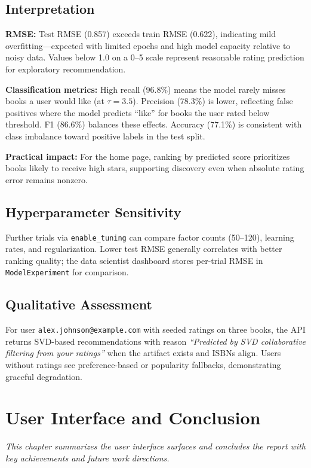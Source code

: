 \documentclass[12pt,a4paper]{report}
\newcommand{\chapterdesc}[1]{%
    \vspace{-0.6\baselineskip}
    \noindent\hspace*{1.5cm}\parbox{\dimexpr\textwidth-1.5cm\relax}{\textit{#1}}
    \par\vspace{0.3\baselineskip}
}
\begin{document}
\section{Interpretation}

\textbf{RMSE:} Test RMSE (0.857) exceeds train RMSE (0.622), indicating mild overfitting---expected with limited epochs and high model capacity relative to noisy data. Values below 1.0 on a 0--5 scale represent reasonable rating prediction for exploratory recommendation.

\textbf{Classification metrics:} High recall (96.8\%) means the model rarely misses books a user would like (at $\tau=3.5$). Precision (78.3\%) is lower, reflecting false positives where the model predicts ``like'' for books the user rated below threshold. F1 (86.6\%) balances these effects. Accuracy (77.1\%) is consistent with class imbalance toward positive labels in the test split.

\textbf{Practical impact:} For the home page, ranking by predicted score prioritizes books likely to receive high stars, supporting discovery even when absolute rating error remains nonzero.

\section{Hyperparameter Sensitivity}

Further trials via \texttt{enable\_tuning} can compare factor counts (50--120), learning rates, and regularization. Lower test RMSE generally correlates with better ranking quality; the data scientist dashboard stores per-trial RMSE in \texttt{ModelExperiment} for comparison.

\section{Qualitative Assessment}

For user \texttt{alex.johnson@example.com} with seeded ratings on three books, the API returns SVD-based recommendations with reason \emph{``Predicted by SVD collaborative filtering from your ratings''} when the artifact exists and ISBNs align. Users without ratings see preference-based or popularity fallbacks, demonstrating graceful degradation.

\chapter{User Interface and Conclusion}
\chapterdesc{This chapter summarizes the user interface surfaces and concludes the report with key achievements and future work directions.}
\end{document}
